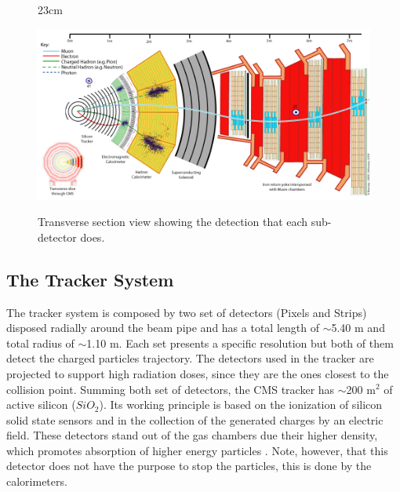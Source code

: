 \begin{landscape}
\begin{figure}[htbp]{23cm}
	\caption{Transverse section view showing the detection that each sub-detector does.}
	\centering
	\includegraphics[scale=0.65]{ChapterCMS/figs/cms_deteccao.png}
	\label{fig:cms_fig2}
\end{figure}
\end{landscape}

\subsection{The Tracker System}
The tracker system is composed by two set of detectors (Pixels and Strips) disposed radially around the beam pipe and has a total length of $\sim$5.40 m and total radius of $\sim$1.10 m. Each set presents a specific resolution but both of them detect the charged particles trajectory. The detectors used in the tracker are projected to support high radiation doses, since they are the ones closest to the collision point. Summing both set of detectors, the CMS tracker has $\sim$200 m$^{2}$ of active silicon ($SiO_{2}$). Its working principle is based on the ionization of silicon solid state sensors and in the collection of the generated charges by an electric field. These detectors stand out of the gas chambers due their higher density, which promotes absorption of higher energy particles \cite{bib:JINST-3-362-2008,bib:CMS-PTDR-2006,bib:grupen-2008}. Note, however, that this detector does not have the purpose to stop the particles, this is done by the calorimeters.

